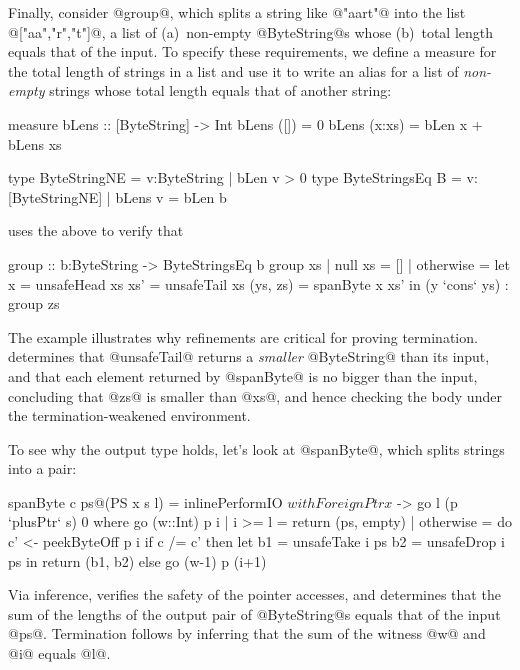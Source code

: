 Finally, consider @group@, which
splits a string like @"aart"@ into the list
@["aa","r","t"]@, \ie a list of
(a)~non-empty @ByteString@s whose 
(b)~total length equals that of the input. 
To specify these requirements, we define a measure for 
the total length of strings in a list and use it to
write an alias for a list of \emph{non-empty} strings
whose total length equals that of another string:

\begin{code}
measure bLens :: [ByteString] -> Int 
bLens ([])     = 0
bLens (x:xs)   = bLen x + bLens xs

type ByteStringNE 
  = {v:ByteString | bLen v > 0}
type ByteStringsEq B
  = {v:[ByteStringNE] | bLens v = bLen b}
\end{code}
%
\toolname uses the above to verify that
%
\begin{code}
group :: b:ByteString -> ByteStringsEq b
group xs
 | null xs   = []
 | otherwise = let x        = unsafeHead xs
                   xs'      = unsafeTail xs
                   (ys, zs) = spanByte x xs' 
               in (y `cons` ys) : group zs
\end{code}
%
The example illustrates why refinements are critical for
proving termination. \toolname determines that @unsafeTail@ 
returns a \emph{smaller} @ByteString@ than its input, and that
each element returned by @spanByte@ is no bigger than the 
input, concluding that @zs@ is smaller than @xs@, and hence
checking the body under the termination-weakened environment.

To see why the output type holds, let's look at @spanByte@,
which splits strings into a pair:
%
\begin{code}
spanByte c ps@(PS x s l) 
  = inlinePerformIO $ withForeignPtr x $
        \p -> go l (p `plusPtr` s) 0
  where
    go (w::Int) p i 
      | i >= l    = return (ps, empty)
      | otherwise = do
          c' <- peekByteOff p i
          if c /= c'
            then let b1 = unsafeTake i ps
                     b2 = unsafeDrop i ps
                 in  return (b1, b2)
            else go (w-1) p (i+1)
\end{code}
%
Via inference, \toolname verifies the safety of 
the pointer accesses, and determines that the 
sum of the lengths of the output pair of 
@ByteString@s equals that of the input @ps@.
Termination follows by inferring that the sum of 
the witness @w@ and @i@ equals @l@.

